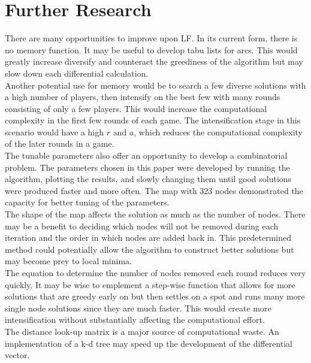 \documentclass[12pt,letterpaper,oneside]{book}
\begin{document}
\section{Further Research}
There are many opportunities to improve upon LF. In its current form, there is no memory function. It may be useful to develop tabu lists for arcs. This would greatly increase diversify and counteract the greediness of the algorithm but may slow down each differential calculation.\\
Another potential use for memory would be to search a few diverse solutions with a high number of players, then intensify on the best few with many rounds consisting of only a few players. This would increase the computational complexity in the first few rounds of each game. The intensification stage in this scenario would have a high $ r $ and $ a $, which reduces the computational complexity of the later rounds in a game.\\
The tunable parameters also offer an opportunity to develop a combinatorial problem. The parameters chosen in this paper were developed by running the algorithm, plotting the results, and slowly changing them until good solutions were produced faster and more often. The map with 323 nodes demonstrated the capacity for better tuning of the parameters.\\
The shape of the map affects the solution as much as the number of nodes. There may be a benefit to deciding which nodes will not be removed during each iteration and the order in which nodes are added back in. This predetermined method could potentially allow the algorithm to construct better solutions but may become prey to local minima.\\
The equation to determine the number of nodes removed each round reduces very quickly. It may be wise to emplement a step-wise function that allows for more solutions that are greedy early on but then settles on a spot and runs many more single node solutions since they are much faster. This would create more intensification without substantially affecting the computational effort.\\
The distance look-up matrix is a major source of computational waste. An implementation of a k-d tree may speed up the development of the differential vector.
\end{document}
